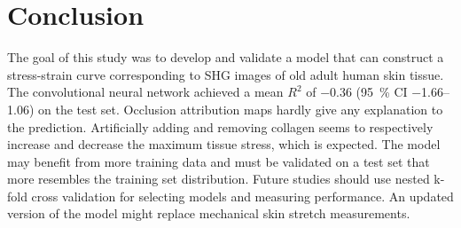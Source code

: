 \section{Conclusion}
The goal of this study was to develop and validate a model that can construct a stress-strain curve corresponding to SHG images of old adult human skin tissue.
The convolutional neural network achieved a mean $R^2$ of \num{-0.36} (\qty{95}{\percent} CI \numrange{-1.66}{1.06}) on the test set.
Occlusion attribution maps hardly give any explanation to the prediction.
Artificially adding and removing collagen seems to respectively increase and decrease the maximum tissue stress, which is expected.
The model may benefit from more training data and must be validated on a test set that more resembles the training set distribution.
Future studies should use nested k-fold cross validation for selecting models and measuring performance.
An updated version of the model might replace mechanical skin stretch measurements.
